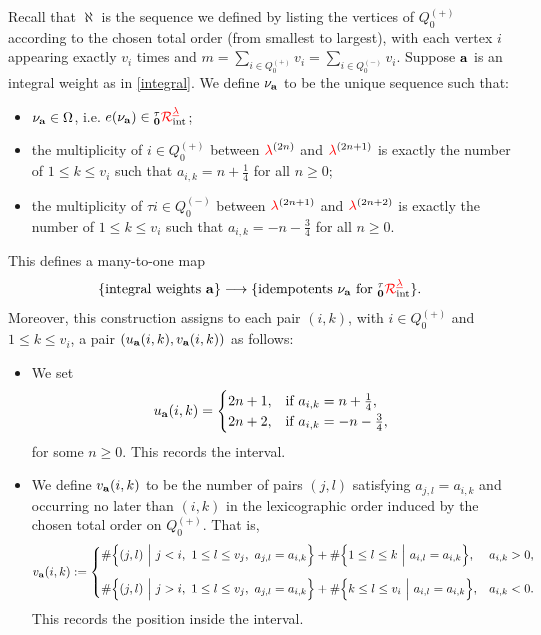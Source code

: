 Recall that  $\aleph$ is the sequence we defined by listing the vertices of $Q_0^{(+)}$ according to the chosen total order (from smallest to largest), with each vertex $i$ appearing exactly $v_i$ times and $m=\sum_{i\in Q_0^{(+)}}v_i=\sum_{i\in Q_0^{(-)}}v_{i}$. Suppose $\mathbf{a}$ is an integral weight as in \cref{integral}. We define $\nu_{\mathbf{a}}$ to be the unique sequence such that:
\begin{itemize}
\item $\nu_{\mathbf{a}}\in \Omega$, i.e.  $e(\nu_{\mathbf{a}})\in {{}^\tau_{\mathbf{0}}{\color{red}\mathcal{R}}^{{{\color{red}\underline{\lambda}}}}_{\text{int}}}$;
 \item 
the multiplicity of $i\in Q_0^{(+)}$ between ${\color{red}\lambda}^{(2n)}$ and ${\color{red}\lambda}^{(2n+1)}$ is exactly 
the number of $1\leq k\leq v_i$ such that $a_{i,k}=n+\frac{1}{4}$ for all $n\geq 0$; 
 \item 
the multiplicity of $\tau i\in Q_0^{(-)}$ between ${\color{red}\lambda}^{(2n+1)}$ and ${\color{red}\lambda}^{(2n+2)}$ is exactly 
the number of $1\leq k\leq v_i$ such that $a_{i,k}=-n-\frac{3}4$ for all $n\geq 0$.
\end{itemize}
This defines a many-to-one map
\[
\{\text{integral weights } \mathbf{a}\} \longrightarrow \{ \text{idempotents $\nu_{\mathbf{a}}$ for } {{}^\tau_{\mathbf{0}}{\color{red}\mathcal{R}}^{{{\color{red}\underline{\lambda}}}}_{\text{int}}} \}.
\]
Moreover, this construction assigns to each pair \((i,k)\), with \(i\in Q_0^{(+)}\) and \(1\le k\le v_i\), a pair \((u_{\mathbf{a}}(i,k),v_{\mathbf{a}}(i,k))\) as follows:
\begin{itemize}
    \item We set
\[
u_{\mathbf{a}}(i,k)=
\begin{cases}
2n+1, & \text{if } a_{i,k}=n+\frac{1}{4},\\
2n+2, & \text{if } a_{i,k}=-n-\frac{3}{4},
\end{cases}
\] for some \(n\geq 0\). This records the interval.
\item We define \(v_{\mathbf{a}}(i,k)\) to be the number of pairs \((j,l)\) satisfying
\(
a_{j,l}=a_{i,k}
\)
and occurring no later than \((i,k)\) in the lexicographic order induced by the chosen total order on \(Q_0^{(+)}\). That is,
\[
v_{\mathbf{a}}(i,k)
:=
\begin{cases}
\displaystyle
\#\Bigl\{(j,l)\ \Big|\
j<i,\ 1\leq l\leq v_j,\
a_{j,l}=a_{i,k}
\Bigr\}
+
\#\Bigl\{1\leq l\leq k\ \Big|\
a_{i,l}=a_{i,k}
\Bigr\},
&
a_{i,k}>0,
\\[1.2em]
\displaystyle
\#\Bigl\{(j,l)\ \Big|\
j>i,\ 1\leq l\leq v_j,\
a_{j,l}=a_{i,k}
\Bigr\}
+
\#\Bigl\{k\leq l\leq v_i\ \Big|\
a_{i,l}=a_{i,k}
\Bigr\},
&
a_{i,k}<0.
\end{cases}
\]
This records the position inside the interval.
\end{itemize}

